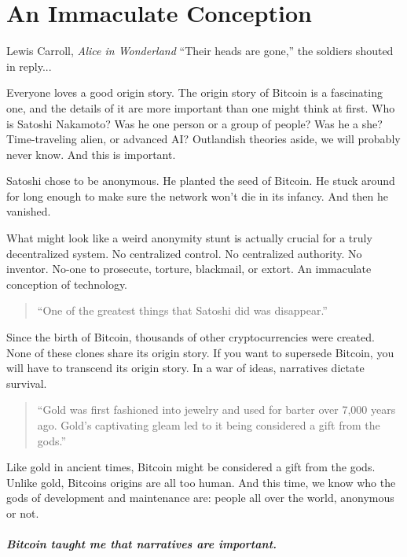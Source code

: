 \chapter{ An Immaculate Conception}
\label{les:5}

\begin{chapquote}{Lewis Carroll, \textit{Alice in Wonderland}}
``Their heads are gone,'' the soldiers shouted in reply...
\end{chapquote}

Everyone loves a good origin story. The origin story of Bitcoin is a
fascinating one, and the details of it are more important than one might
think at first. Who is Satoshi Nakamoto? Was he one person or a group of
people? Was he a she? Time-traveling alien, or advanced AI? Outlandish
theories aside, we will probably never know. And this is important.

Satoshi chose to be anonymous. He planted the seed of Bitcoin. He stuck
around for long enough to make sure the network won't die in its
infancy. And then he vanished.

What might look like a weird anonymity stunt is actually crucial for a
truly decentralized system. No centralized control. No centralized
authority. No inventor. No-one to prosecute, torture, blackmail, or
extort. An immaculate conception of technology.

\begin{quotation}
``One of the greatest things that Satoshi did was disappear.''
\end{quotation}

Since the birth of Bitcoin, thousands of other cryptocurrencies were
created. None of these clones share its origin story. If you want to
supersede Bitcoin, you will have to transcend its origin story. In a war
of ideas, narratives dictate survival.

\begin{quotation}
``Gold was first fashioned into jewelry and used for barter over 7,000
years ago. Gold's captivating gleam led to it being considered a gift
from the gods.''
\end{quotation}

Like gold in ancient times, Bitcoin might be considered a gift from the
gods. Unlike gold, Bitcoins origins are all too human. And this time, we
know who the gods of development and maintenance are: people all over
the world, anonymous or not.

\paragraph{Bitcoin taught me that narratives are important.}

